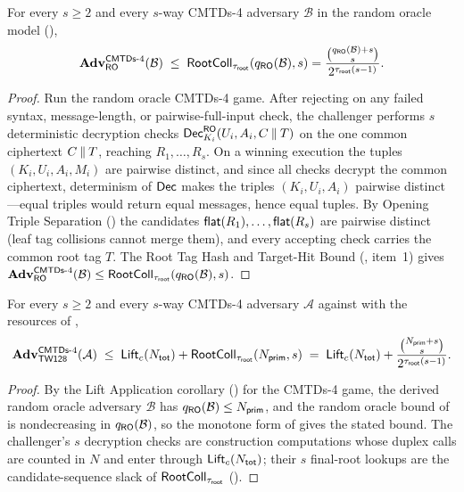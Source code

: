 \begin{theorem}
\label{thm:cmtds4-ro}
For every $s \geq 2$ and every $s$-way CMTDs-4
adversary $\mathcal{B}$ in the \TW{} random oracle model
(),
\[
  \mathbf{Adv}^{\mathsf{CMTDs}\text{-}4}_{\mathsf{RO}}(\mathcal{B})
  \;\leq\; \mathsf{RootColl}_{\tau_{\mathsf{root}}}(q_{\mathsf{RO}}(\mathcal{B}), s)
  = \frac{\binom{q_{\mathsf{RO}}(\mathcal{B}) + s}{s}}{2^{\tau_{\mathsf{root}} (s - 1)}}.
\]
\end{theorem}

\begin{proof}
Run the random oracle CMTDs-4 game. After rejecting on any failed syntax,
message-length, or pairwise-full-input check, the challenger performs $s$
deterministic decryption checks $\mathsf{Dec}_{K_i}^{\mathsf{RO}}(U_i, A_i, C \mathbin{\|} T)$ on
the one common ciphertext $C \mathbin{\|} T$, reaching $R_1,\dots,R_s$. On a winning
execution the tuples $(K_i, U_i, A_i, M_i)$ are pairwise distinct, and since
all checks decrypt the common ciphertext, determinism of $\mathsf{Dec}$ makes the
triples $(K_i, U_i, A_i)$ pairwise distinct---equal triples would return
equal messages, hence equal tuples. By Opening Triple Separation
() the candidates $\mathsf{flat}(R_1),\dots,\mathsf{flat}(R_s)$
are pairwise distinct (leaf tag collisions cannot merge them), and every
accepting check carries the common root tag $T$. The Root Tag Hash and Target-Hit Bound
(, item~1) gives
$\mathbf{Adv}^{\mathsf{CMTDs}\text{-}4}_{\mathsf{RO}}(\mathcal{B}) \leq \mathsf{RootColl}_{\tau_{\mathsf{root}}}(q_{\mathsf{RO}}(\mathcal{B}), s)$.
\end{proof}

\begin{corollary}
\label{cor:cmtds4}
For every $s \geq 2$ and every $s$-way CMTDs-4
adversary $\mathcal{A}$ against \TW{} with the resources of
,
\[
  \mathbf{Adv}^{\mathsf{CMTDs}\text{-}4}_{\textsf{TW128}}(\mathcal{A})
  \;\leq\;
  \mathsf{Lift}_c(N_{\mathsf{tot}}) + \mathsf{RootColl}_{\tau_{\mathsf{root}}}(N_{\mathsf{prim}}, s)
  \;=\;
  \mathsf{Lift}_c(N_{\mathsf{tot}}) + \frac{\binom{N_{\mathsf{prim}} + s}{s}}{2^{\tau_{\mathsf{root}} (s - 1)}}.
\]
\end{corollary}

\begin{proof}
By the Lift Application corollary () for the
CMTDs-4 game, the derived random oracle adversary $\mathcal{B}$ has
$q_{\mathsf{RO}}(\mathcal{B}) \leq N_{\mathsf{prim}}$, and the random oracle bound of
 is nondecreasing in $q_{\mathsf{RO}}(\mathcal{B})$, so the
monotone form of  gives the stated bound. The
challenger's $s$ decryption checks are construction computations whose
duplex calls are counted in $N$ and enter through $\mathsf{Lift}_c(N_{\mathsf{tot}})$; their
$s$ final-root lookups are the candidate-sequence slack of
$\mathsf{RootColl}_{\tau_{\mathsf{root}}}$ ().
\end{proof}

